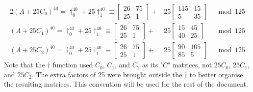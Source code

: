 \documentclass[a4paper, 12pt, reqno]{amsart}
\begin{document}
		\begin{alignat*}{2}
			(A + 25C_0)^{40} = \dag_0^{40} + 25\dag_1^{40} \equiv \begin{bmatrix}
				26 & 75 \\
				25 &  1
			\end{bmatrix} + & 25\begin{bmatrix}
				115 & 15 \\
				  5 & 35
			\end{bmatrix} & \mod{125} \\
			(A + 25C_1)^{40} = \dag_0^{40} + 25\dag_1^{40} \equiv \begin{bmatrix}
				26 & 75 \\
				25 &  1
			\end{bmatrix} + & 25\begin{bmatrix}
				15 & 45 \\
				40 & 25
			\end{bmatrix} & \mod{125} \\
			(A + 25C_2)^{40} = \dag_0^{40} + 25\dag_1^{40} \equiv \begin{bmatrix}
				26 & 75 \\
				25 &  1
			\end{bmatrix} + & 25\begin{bmatrix}
				90 & 105 \\
				85 &   5
			\end{bmatrix} & \mod{125}
		\end{alignat*}
		Note that the $\dag$ function used $C_0$, $C_1$, and $C_2$ as its "$C$" matrices, not $25C_0$, $25C_1$, and $25C_2$. The extra factors of 25 were brought outside the
		$\dag$ to better organise the resulting matrices. This convention will be used for the rest of the document.
		
\end{document}
